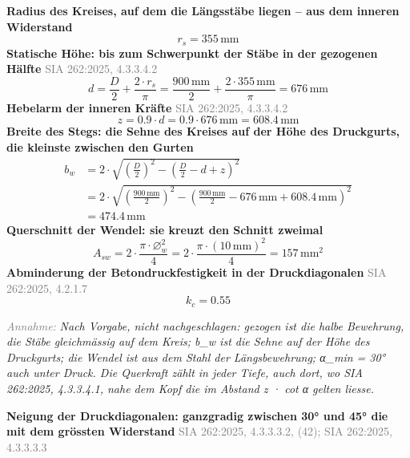 \documentclass[11pt,a4paper]{article}
\newcommand{\normref}[1]{{\small\textcolor{gray}{#1}}}
\newcommand{\hinweis}[2]{\par\noindent\textcolor{gray}{\textit{#1:}} \textit{#2}\par}
\begin{document}
\noindent\textbf{Radius des Kreises, auf dem die Längsstäbe liegen – aus dem inneren Widerstand}
\begin{equation*}
r_s = 355\,\mathrm{mm}
\end{equation*}
\noindent\textbf{Statische Höhe: bis zum Schwerpunkt der Stäbe in der gezogenen Hälfte} \hfill \normref{SIA 262:2025, 4.3.3.4.2}
\begin{equation*}
d = \frac{D}{2} + \frac{2 \cdot r_s}{\pi} = \frac{900\,\mathrm{mm}}{2} + \frac{2 \cdot 355\,\mathrm{mm}}{\pi} = 676\,\mathrm{mm}
\end{equation*}
\noindent\textbf{Hebelarm der inneren Kräfte} \hfill \normref{SIA 262:2025, 4.3.3.4.2}
\begin{equation*}
z = 0.9 \cdot d = 0.9 \cdot 676\,\mathrm{mm} = 608.4\,\mathrm{mm}
\end{equation*}
\noindent\textbf{Breite des Stegs: die Sehne des Kreises auf der Höhe des Druckgurts, die kleinste zwischen den Gurten}
\begin{equation*}
\begin{aligned}
  b_w &= 2 \cdot \sqrt{\left(\frac{D}{2}\right)^{2} - \left(\frac{D}{2} - d + z\right)^{2}} \\
  &= 2 \cdot \sqrt{\left(\frac{900\,\mathrm{mm}}{2}\right)^{2} - \left(\frac{900\,\mathrm{mm}}{2} - 676\,\mathrm{mm} + 608.4\,\mathrm{mm}\right)^{2}} \\
  &= 474.4\,\mathrm{mm}
\end{aligned}
\end{equation*}
\noindent\textbf{Querschnitt der Wendel: sie kreuzt den Schnitt zweimal}
\begin{equation*}
A_{sw} = 2 \cdot \frac{\pi \cdot \varnothing_w^{2}}{4} = 2 \cdot \frac{\pi \cdot \left(10\,\mathrm{mm}\right)^{2}}{4} = 157\,\mathrm{mm}^{2}
\end{equation*}
\noindent\textbf{Abminderung der Betondruckfestigkeit in der Druckdiagonalen} \hfill \normref{SIA 262:2025, 4.2.1.7}
\begin{equation*}
k_c = 0.55
\end{equation*}
\hinweis{Annahme}{Nach Vorgabe, nicht nachgeschlagen: gezogen ist die halbe Bewehrung, die Stäbe gleichmässig auf dem Kreis; b\_w ist die Sehne auf der Höhe des Druckgurts; die Wendel ist aus dem Stahl der Längsbewehrung; α\_min = 30° auch unter Druck. Die Querkraft zählt in jeder Tiefe, auch dort, wo SIA 262:2025, 4.3.3.4.1, nahe dem Kopf die im Abstand z · cot α gelten liesse.}
\noindent\textbf{Neigung der Druckdiagonalen: ganzgradig zwischen 30° und 45° die mit dem grössten Widerstand} \hfill \normref{SIA 262:2025, 4.3.3.3.2, (42); SIA 262:2025, 4.3.3.3.3}
\end{document}
